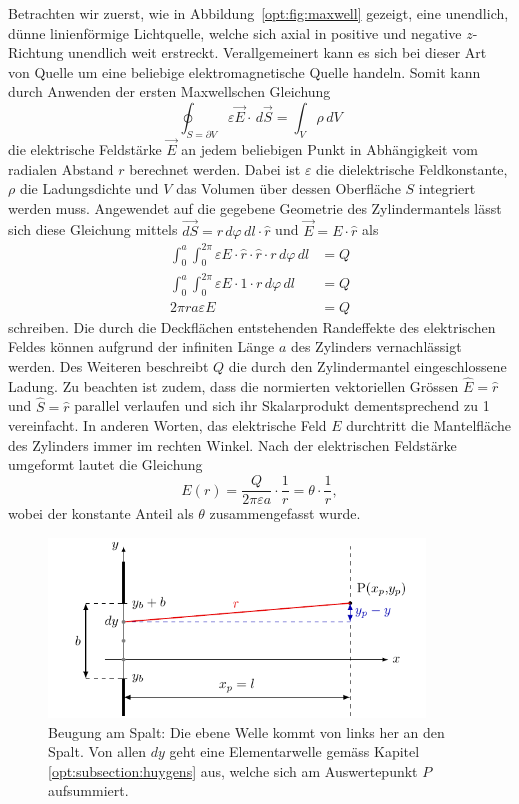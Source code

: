 Betrachten wir zuerst, wie in Abbildung~\ref{opt:fig:maxwell} gezeigt, eine unendlich, dünne linienförmige Lichtquelle, welche sich axial in positive und negative $z$-Richtung unendlich weit erstreckt.
Verallgemeinert kann es sich bei dieser Art von Quelle um eine beliebige elektromagnetische Quelle handeln.
Somit kann durch Anwenden der ersten Maxwellschen Gleichung
\begin{equation}
\oint_{S=\partial V} \varepsilon\vec{E} \cdot\, d\vec{S}
=
\int_{V}\rho\, dV
\end{equation}
die elektrische Feldstärke $\vec{E}$ an jedem beliebigen Punkt in Abhängigkeit vom radialen Abstand $r$ berechnet werden.
Dabei ist $\varepsilon$ die dielektrische Feldkonstante, $\rho$ die Ladungsdichte und $V$ das Volumen über dessen Oberfläche $S$ integriert werden muss.
Angewendet auf die gegebene Geometrie des Zylindermantels lässt sich diese Gleichung mittels $\vec{dS} = r\, d\varphi\, dl \cdot \hat{r}$ und $\vec{E} = E \cdot \hat{r}$ als
\begin{align}
\int_{0}^{a}\int_{0}^{2\pi} \varepsilon E\cdot \hat{r} \cdot \hat{r} \cdot r\, d\varphi\, dl
&=
Q
\\
\int_{0}^{a}\int_{0}^{2\pi} \varepsilon E\cdot 1 \cdot r\, d\varphi\, dl
&=
Q
\\
2\pi ra\varepsilon E
&=
Q
\end{align}
schreiben.
Die durch die Deckflächen entstehenden Randeffekte des elektrischen Feldes können aufgrund der infiniten Länge $a$ des Zylinders vernachlässigt werden.
Des Weiteren beschreibt $Q$ die durch den Zylindermantel eingeschlossene Ladung.
Zu beachten ist zudem, dass die normierten vektoriellen Grössen $\hat{E} = \hat{r}$ und $\hat{S} = \hat{r}$ parallel verlaufen und sich ihr Skalarprodukt dementsprechend zu 1 vereinfacht.
In anderen Worten, das elektrische Feld $E$ durchtritt die Mantelfläche des Zylinders immer im rechten Winkel.
Nach der elektrischen Feldstärke umgeformt lautet die Gleichung
\begin{equation}
E(r)
=
\frac{Q}{2\pi\varepsilon a} \cdot \frac{1}{r}
=
\theta \cdot \frac{1}{r}
,
\label{opt:equation:E}
\end{equation}
wobei der konstante Anteil als $\theta$ zusammengefasst wurde.

\begin{figure}
    \centering
    \includegraphics[width=100mm]{papers/opt/images/derivation.pdf}
    \caption{Beugung am Spalt: Die ebene Welle kommt von links her an den Spalt. 
    Von allen $dy$ geht eine Elementarwelle gemäss Kapitel \ref{opt:subsection:huygens} aus, welche sich am Auswertepunkt $P$ aufsummiert.}
    \label{opt:fig:geometricalShape}
\end{figure}

